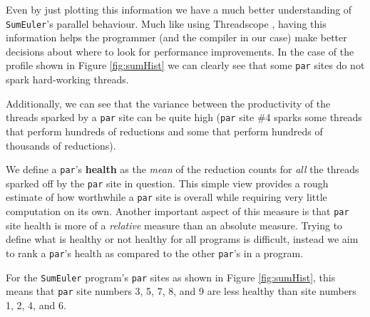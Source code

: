 Even by just plotting this information we have a much better understanding of
\verb|SumEuler|'s parallel behaviour. Much like using Threadscope
\citep{Jones2009Tuning}, having this information helps the programmer (and the
compiler in our case) make better decisions about where to look for performance
improvements. In the case of the profile shown in Figure \ref{fig:sumHist} we
can clearly see that some \verb|par| sites do not spark hard-working threads.

Additionally, we can see that the variance between the productivity of the
threads sparked by a \verb|par| site can be quite high (\verb|par| site \#4
sparks some threads that perform hundreds of reductions and some that
perform hundreds of thousands of reductions).

We define a \verb|par|'s \textbf{health} as the \emph{mean} of the reduction
counts for \emph{all} the threads sparked off by the \verb|par| site in
question. This simple view provides a rough estimate of how worthwhile a
\verb|par| site is overall while requiring very little computation on its own.
Another important aspect of this measure is that \verb|par| site health is more
of a \emph{relative} measure than an absolute measure. Trying to define what is
healthy or not healthy for all programs is difficult, instead we aim to rank a
\verb|par|'s health as compared to the other \verb|par|'s in a program.

For the \verb|SumEuler| program's \verb|par| sites as shown in Figure
\ref{fig:sumHist}, this means that \verb|par| site numbers 3, 5, 7, 8, and 9
are less healthy than site numbers 1, 2, 4, and 6.
